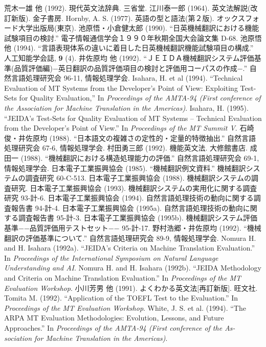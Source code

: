 \begin{thebibliography}{99}

\bibitem{}
荒木一雄 他 (1992). 現代英文法辞典. 三省堂.
\bibitem{}
江川泰一郎 (1964). 英文法解説(改訂新版). 金子書房.
\bibitem{}
Hornby, A. S. (1977). 英語の型と語法(第２版). オックスフォード大学出版局(東京).
\bibitem{}
池原悟・小倉健太郎 (1990). ``日英機械翻訳における機能試験項目の検討.''
電子情報通信学会１９９０年秋期全国大会論文集 D-68.
\bibitem{}
池原悟 他 (1994). ``言語表現体系の違いに着目した日英機械翻訳機能試験項目の構成.''
人工知能学会誌, {\bf 9} (4).
\bibitem{}
井佐原均 他 (1992). ``ＪＥＩＤＡ機械翻訳システム評価基準(品質評価編)−英日翻訳の品質評価項目の検討と評価用コーパスの作成−.''
自然言語処理研究会 96-11, 情報処理学会.
\bibitem{}
Isahara, H. et al (1994).
``Technical Evaluation of MT Systems from the Developer's Point of View: Exploiting Test-Sets for Quality Evaluation,''
In {\em Proceedings of the AMTA-94 (First conference of the Association for Machine Translation in the Americas)}.
\bibitem{}
Isahara, H. (1995).
``JEIDA's Test-Sets for Quality Evaluation of MT Systems -- Technical Evaluation from the Developer's Point of View.''
In {\em Proceedings of the MT Summit V}.
\bibitem{}
石崎俊・井佐原均 (1988).
``日本語文の複雑さの定性的・定量的特徴抽出.''
自然言語処理研究会 67-6, 情報処理学会.
\bibitem{}
村田勇三郎 (1992). 機能英文法. 大修館書店.
\bibitem{}
成田一 (1988). ``機械翻訳における構造処理能力の評価.''
自然言語処理研究会 69-1, 情報処理学会.
\bibitem{}
日本電子工業振興協会 (1985). ``機械翻訳例文資料.''
機械翻訳システムの調査研究 60-C-513.
\bibitem{}
日本電子工業振興協会 (1988). 機械翻訳システムの調査研究.
\bibitem{}
日本電子工業振興協会 (1993). 機械翻訳システムの実用化に関する調査研究 93-計-6.
\bibitem{}
日本電子工業振興協会 (1994). 自然言語処理技術の動向に関する調査報告書 94-計-4.
\bibitem{}
日本電子工業振興協会 (1995a). 自然言語処理技術の動向に関する調査報告書 95-計-3.
\bibitem{}
日本電子工業振興協会 (1995b).
機械翻訳システム評価基準−−品質評価用テストセット−− 95-計-17.
\bibitem{}
野村浩郷・井佐原均 (1992). ``機械翻訳の評価基準について.''
自然言語処理研究会 89-9, 情報処理学会.
\bibitem{}
Nomura H. and H. Isahara (1992a). ``JEIDA's Criteria on Machine Translation Evaluation.''
In {\em Proceedings of the International Symposium on Natural Language Understanding and AI}.
\bibitem{}
Nomura H. and H. Isahara (1992b). ``JEIDA Methodology and Criteria on
Machine Translation Evaluation.'' 
In {\em Proceedings of the MT Evaluation Workshop}.
\bibitem{}
小川芳男 他 (1991). よくわかる英文法[再訂新版]. 旺文社.
\bibitem{}
Tomita M. (1992). ``Application of the TOEFL Test to the Evaluation.''
In {\em Proceedings of the MT Evaluation Workshop}.
\bibitem{}
White, J. S. et al. (1994). ``The ARPA MT Evaluation Methodologies: Evolution, Lessons, and Future Approaches.''
In {\em Proceedings of the AMTA-94 (First conference of the As- sociation for Machine Translation in the Americas)}.

\end{thebibliography}


